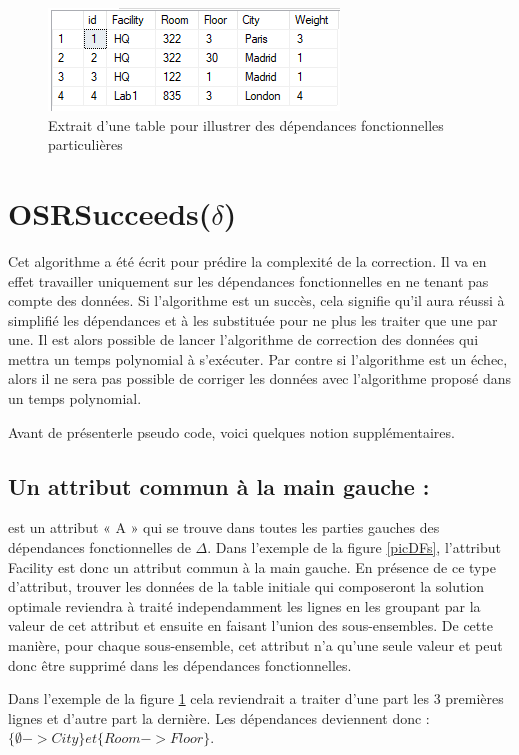 \documentclass[12pt, a4paper, oneside, titlepage]{book}%
\begin{document}
\begin{figure}[ht]
	\center
	\includegraphics{DFnok.png}
	\caption{\label{picDFnok} Extrait d'une table pour illustrer des dépendances fonctionnelles particulières}
\end{figure}


\section{OSRSucceeds($\delta$)}

Cet algorithme a été écrit pour prédire la complexité de la correction. Il va en effet travailler uniquement sur les dépendances fonctionnelles en ne tenant pas compte des données. Si l'algorithme est un succès, cela signifie qu'il aura réussi à simplifié les dépendances et à les substituée pour ne plus les traiter que une par une. Il est alors possible de lancer l'algorithme de correction des données qui mettra un temps polynomial à s'exécuter. Par contre si l'algorithme est un échec, alors il ne sera pas possible de corriger les données avec l'algorithme proposé dans un temps polynomial.

Avant de présenterle pseudo code, voici quelques notion supplémentaires.

\subsection{Un attribut commun à la main gauche : } 
est un attribut « A » qui se trouve dans toutes les parties gauches des dépendances fonctionnelles de $\Delta$. Dans l'exemple de la figure \ref{picDFs}, l'attribut \fg Facility \og est donc un attribut commun à la main gauche. En présence de ce type d'attribut, trouver les données de la table initiale qui composeront la solution optimale reviendra à traité independamment les lignes en les groupant par la valeur de cet attribut et ensuite en faisant l'union des sous-ensembles.  De cette manière, pour chaque sous-ensemble, cet attribut n'a qu'une seule valeur et peut donc être supprimé dans les dépendances fonctionnelles.

Dans l'exemple de la figure \ref{picDFnok} cela reviendrait a traiter d'une part les 3 premières lignes et d'autre part la dernière. Les dépendances deviennent donc : $\{ \emptyset -> City \} et \{  Room -> Floor \}$.
\end{document}
